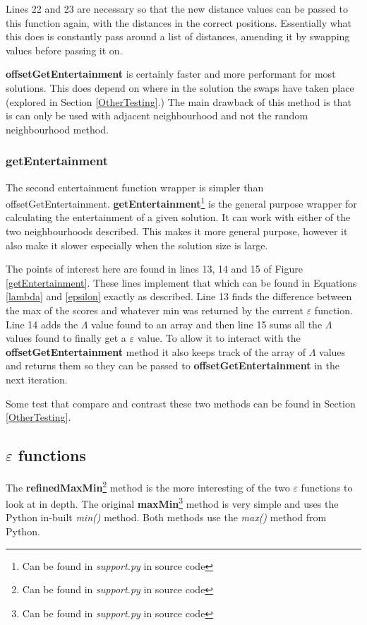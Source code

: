 \documentclass[12pt]{report}
\begin{document}
Lines 22 and 23 are necessary so that the new distance values can be passed to this function again, with the distances in the correct positions. Essentially what this does is constantly pass around a list of distances, amending it by swapping values before passing it on.

\textbf{offsetGetEntertainment} is certainly faster and more performant for most solutions. This does depend on where in the solution the swaps have taken place (explored in Section \ref{OtherTesting}.) The main drawback of this method is that is can only be used with adjacent neighbourhood and not the random neighbourhood method.

\subsubsection{getEntertainment}
The second entertainment function wrapper is simpler than {offsetGetEntertainment}. \textbf{getEntertainment}\footnote{Can be found in \textit{support.py} in source code} is the general purpose wrapper for calculating the entertainment of a given solution. It can work with either of the two neighbourhoods described. This makes it more general purpose, however it also make it slower especially when the solution size is large.

The points of interest here are found in lines 13, 14 and 15 of Figure \ref{getEntertainment}. These lines implement that which can be found in Equations \ref{lambda} and \ref{epsilon} exactly as described. Line 13 finds the difference between the max of the scores and whatever min was returned by the current $\varepsilon$ function. Line 14 adds the $\Lambda$ value found to an array and then line 15 sums all the $\Lambda$ values found to finally get a $\varepsilon$ value. To allow it to interact with the \textbf{offsetGetEntertainment} method it also keeps track of the array of $\Lambda$ values and returns them so they can be passed to \textbf{offsetGetEntertainment} in the next iteration.

Some test that compare and contrast these two methods can be found in Section \ref{OtherTesting}.

\subsection{$\varepsilon$ functions}\label{Imp-eFunctions}
The \textbf{refinedMaxMin}\footnote{Can be found in \textit{support.py} in source code} method is the more interesting of the two $\varepsilon$ functions to look at in depth. The original \textbf{maxMin}\footnote{Can be found in \textit{support.py} in source code} method is very simple and uses the Python in-built \textit{min()} \cite{PythonMin} method. Both methods use the \textit{max()} \cite{PythonMax} method from Python.
\end{document}
